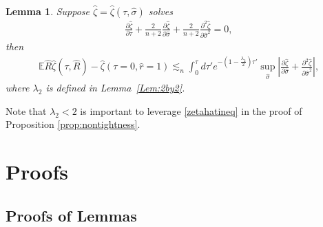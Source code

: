 \documentclass[english, letterpaper,12pt,reqno]{amsart}
\newtheorem{lemma}[theorem]{Lemma}
\theoremstyle{remark}
\theoremstyle{plain}
\newcommand{\1}{\mathbf{1}}
\def\bbE{\mathbb E}
\begin{document}
\begin{lemma}\label{lem:zeta} 
   Suppose $\hat \zeta=\hat\zeta(\tau,\hat\sigma)$ solves \begin{align}\label{zetahat2}
\frac{\partial \hat \zeta}{\partial \tau}+\frac{2}{n+2}\frac{\partial \hat \zeta}{\partial\hat \sigma }+ \frac{2}{n+2}\frac{\partial^2 \hat \zeta}{\partial \hat \sigma^2}=0,
\end{align}
then \begin{align} \label{zetahatineq}
    \bbE \hat R \hat \zeta(\tau, \hat R) - \hat \zeta(\tau=0,\hat r= 1 ) \lesssim_{ n } \int_0^{\tau} d\tau' e^{-(1-\frac{\lambda_2}{2})\tau'} \sup_{\hat \sigma} \left|\frac{\partial \hat \zeta}{\partial\hat \sigma}+ \frac{\partial^2 \hat \zeta}{\partial\hat \sigma^2} \right|  ,
 \end{align}
 where $\lambda_2$ is defined in Lemma~\ref{Lem:2by2}. 
\end{lemma}
%
\noindent
Note that $\lambda_2<2$ is important to leverage \eqref{zetahatineq} in the proof of Proposition \ref{prop:nontightness}.




























\section{Proofs}
\subsection{Proofs of Lemmas}
\end{document}
